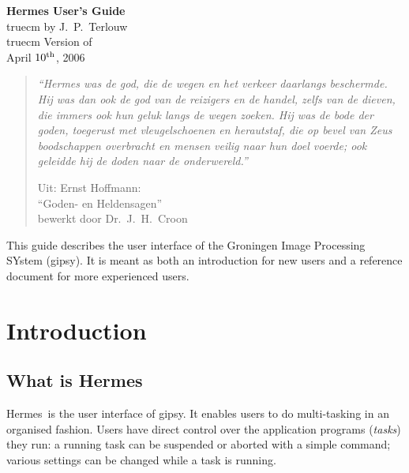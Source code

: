 \def\H{{Hermes}}
\def\tH{{tHermes}}
\def\xH{{xHermes}}
\def\nH{{nHermes}}
\def\G{{\sc gipsy}}
\def\COA{{\sc coa}}
\def\UCA{{\sc uca}}
\def\TSA{{\sc tsa}}
\parskip=3mm
\parindent=0mm
\makeindex
\evensidemargin=0cm
\oddsidemargin=0cm
\textwidth=16cm
\textheight=21cm

\thispagestyle{empty}
\begin{titlepage}
\null
\begin{center}
{\bf\huge Hermes User's Guide\\}
 truecm
{\large by J.~P.~Terlouw\\}
 truecm
Version of\\
April $10^{\rm th}$, 2006
\end{center}
\vfill
\begin{quote}
\it
\hspace{3mm}``Hermes was de god, die de wegen en het verkeer daarlangs be\-scherm\-de.
Hij was dan ook de god van de reizigers en de handel, zelfs van de dieven, die
immers ook hun geluk langs de wegen zoeken.
Hij was de bode der goden, toegerust met vleugelschoenen en
heraut\-staf, die op
bevel van Zeus boodschappen overbracht en mensen veilig naar hun doel voerde;
ook geleidde hij de doden naar de onder\-wereld.''
\begin{flushright}
\rm
Uit: Ernst Hoffmann:\\
``Goden- en Heldensagen''\\
bewerkt door Dr.~J.~H.~Croon\\
\end{flushright}
\end{quote}
\vfill
This guide describes the user interface of the
Groningen Image Processing SYstem (\hbox{\G}).
It is meant as both an introduction for new users and
a reference document for more experienced users.

\end{titlepage}
\thispagestyle{empty}\strut\newpage
\thispagestyle{empty}
\tableofcontents
\newpage
{}
\chapter{Introduction}
\section*{What is \H}
\H\ is the user interface of \G.
It enables users to do multi-tasking in an organised fashion.
Users have direct control over the application programs ({\em tasks\/}) they run:
a running task can be suspended or aborted with a simple command; various
settings can be changed while a task is running.

